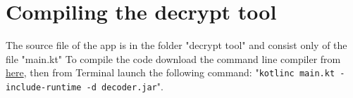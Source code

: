 \section{Compiling the decrypt tool}
The source file of the app is in the folder "decrypt tool" and consist only of the file "main.kt"
To compile the code download the command line compiler from \href{https://kotlinlang.org/docs/command-line.html}{here}, then from Terminal launch the following command:  "\texttt{kotlinc main.kt -include-runtime -d decoder.jar}".



